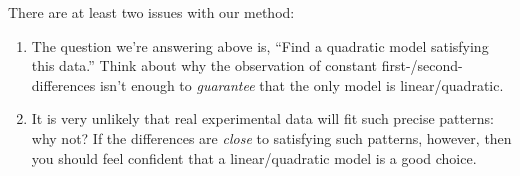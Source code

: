 
There are at least two issues with our method:
\begin{enumerate}
  \item The question we're answering above is, ``Find a quadratic model satisfying this data.'' Think about why the observation of constant first-/second-differences isn't enough to \emph{guarantee} that the only model is linear/quadratic. 

  \item It is very unlikely that real experimental data will fit such precise patterns: why not? If the differences are \emph{close} to satisfying such patterns, however, then you should feel confident that a linear/quadratic model is a good choice.
\end{enumerate}
\goodbreak


